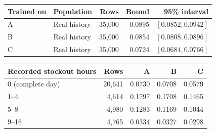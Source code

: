 \begin{tabular}{@{}llrrr@{}}
\toprule
Trained on & Population & Rows & Bound & 95\% interval \\
\midrule
A & Real history & 35,000 & 0.0895 & $[0.0852, 0.0942]$ \\
B & Real history & 35,000 & 0.0854 & $[0.0808, 0.0896]$ \\
C & Real history & 35,000 & 0.0724 & $[0.0684, 0.0766]$ \\
\bottomrule
\end{tabular}

\vspace{6pt}

\begin{tabular}{@{}lrrrr@{}}
\toprule
Recorded stockout hours & Rows & A & B & C \\
\midrule
0 (complete day) & 20,641 & 0.0730 & 0.0708 & 0.0579 \\
1--4 & 4,614 & 0.1797 & 0.1708 & 0.1465 \\
5--8 & 4,980 & 0.1283 & 0.1169 & 0.1044 \\
9--16 & 4,765 & 0.0334 & 0.0327 & 0.0298 \\
\bottomrule
\end{tabular}

